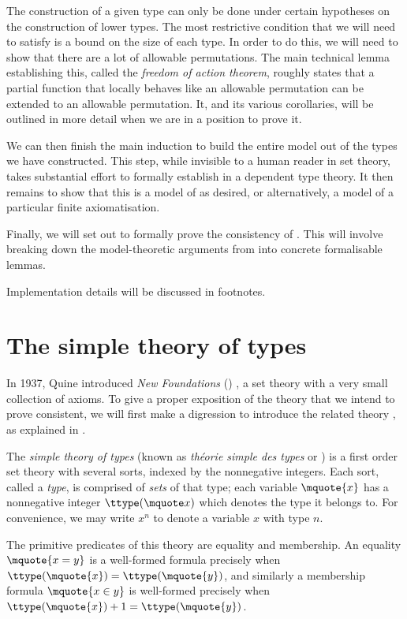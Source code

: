 The construction of a given type can only be done under certain hypotheses on the construction of lower types.
The most restrictive condition that we will need to satisfy is a bound on the size of each type.
In order to do this, we will need to show that there are a lot of allowable permutations.
The main technical lemma establishing this, called the \emph{freedom of action theorem}, roughly states that a partial function that locally behaves like an allowable permutation can be extended to an allowable permutation.
It, and its various corollaries, will be outlined in more detail when we are in a position to prove it.

We can then finish the main induction to build the entire model out of the types we have constructed.
This step, while invisible to a human reader in set theory, takes substantial effort to formally establish in a dependent type theory.
It then remains to show that this is a model of {\TTT} as desired, or alternatively, a model of a particular finite axiomatisation.

Finally, we will set out to formally prove the consistency of \NF.
This will involve breaking down the model-theoretic arguments from \cite{typical-ambiguity,holmes-ttt} into concrete formalisable lemmas.

Implementation details will be discussed in footnotes.

\section{The simple theory of types}

In 1937, Quine introduced \emph{New Foundations} (\NF) \cite{quine-nf}, a set theory with a very small collection of axioms.
To give a proper exposition of the theory that we intend to prove consistent, we will first make a digression to introduce the related theory {\TST}, as explained in \cite{con-nf}.

The \emph{simple theory of types} (known as \emph{théorie simple des types} or {\TST}) is a first order set theory with several sorts, indexed by the nonnegative integers.
Each sort, called a \emph{type}, is comprised of \emph{sets} of that type; each variable \( \mquote{x} \) has a nonnegative integer \( \ttype(\mquote x) \) which denotes the type it belongs to.
For convenience, we may write \( x^n \) to denote a variable \( x \) with type \( n \).

The primitive predicates of this theory are equality and membership.
An equality \( \mquote{x = y} \) is a well-formed formula precisely when \( \ttype(\mquote{x}) = \ttype(\mquote{y}) \), and similarly a membership formula \( \mquote{x \in y} \) is well-formed precisely when \( \ttype(\mquote{x}) + 1 = \ttype(\mquote{y}) \).

